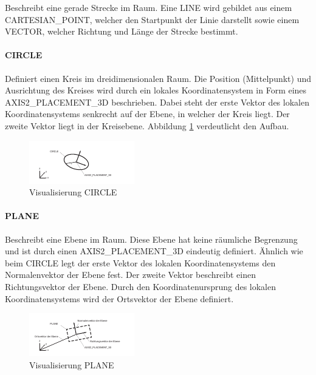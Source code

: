 Beschreibt eine gerade Strecke im Raum. Eine LINE wird gebildet aus einem CARTESIAN\_POINT, welcher den Startpunkt der Linie darstellt sowie einem VECTOR, welcher Richtung und Länge der Strecke bestimmt. 

\paragraph{CIRCLE}

Definiert einen Kreis im dreidimensionalen Raum. Die Position (Mittelpunkt) und Ausrichtung des Kreises wird durch ein lokales Koordinatensystem in Form eines AXIS2\_PLACEMENT\_3D beschrieben. Dabei steht der erste Vektor des lokalen Koordinatensystems senkrecht auf der Ebene, in welcher der Kreis liegt. Der zweite Vektor liegt in der Kreisebene. Abbildung \ref{fig:circleentity} verdeutlicht den Aufbau. 

\begin{figure}[h]
	\centering
	
	\includegraphics[width=0.7\linewidth]{img/circle_entity.pdf}
	
	\caption{Visualisierung CIRCLE}
	\label{fig:circleentity}
\end{figure} 

\paragraph{PLANE}

Beschreibt eine Ebene im Raum. Diese Ebene hat keine räumliche Begrenzung und ist durch einen AXIS2\_PLACEMENT\_3D eindeutig definiert. Ähnlich wie beim CIRCLE legt der erste Vektor des lokalen Koordinatensystems den Normalenvektor der Ebene fest. Der zweite Vektor beschreibt einen Richtungsvektor der Ebene. Durch den Koordinatenursprung des lokalen Koordinatensystems wird der Ortsvektor der Ebene definiert. 

\begin{figure}[h]
	\centering
	
	\includegraphics[width=0.7\linewidth]{img/plane_entity.pdf}
	
	
	\caption{Visualisierung PLANE}
	
\end{figure} 

